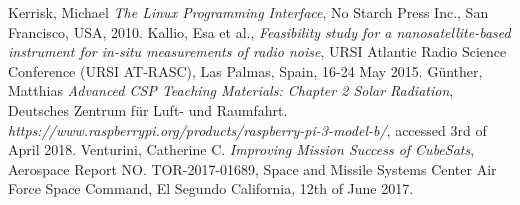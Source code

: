 \documentclass[english,12pt,a4paper,pdftex,elec,utf8]{aaltothesis}
\begin{document}
\begin{thebibliography}{99}
 Kerrisk, Michael
  \textit{The Linux Programming Interface}, No Starch Press Inc., San Francisco, USA, 2010.
 Kallio, Esa et al.,
  \textit{Feasibility study for a nanosatellite-based instrument for in-situ measurements of radio noise},  URSI Atlantic Radio Science Conference (URSI AT-RASC), Las Palmas, Spain, 16-24 May 2015.
 Günther, Matthias
  \textit{Advanced CSP Teaching Materials: Chapter 2 Solar Radiation}, Deutsches Zentrum für Luft- und Raumfahrt. 
  \textit{https://www.raspberrypi.org/products/raspberry-pi-3-model-b/}, accessed 3rd of April 2018.
 Venturini, Catherine C.
  \textit{Improving Mission Success of CubeSats}, Aerospace Report NO.
TOR-2017-01689, Space and Missile Systems Center Air Force Space Command, El Segundo California, 12th of June 2017.

\end{thebibliography}

\clearpage

\thesisappendix
\end{document}
